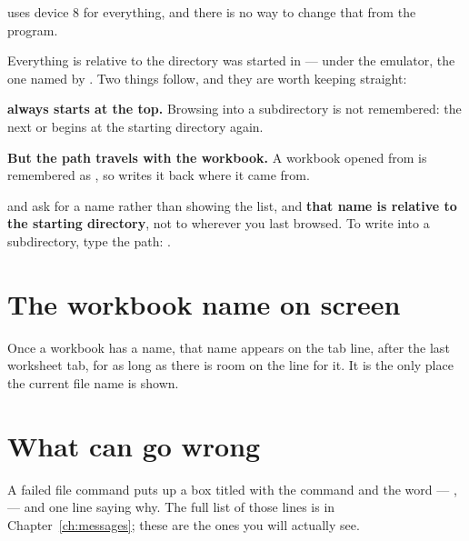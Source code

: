 \ccprod{} uses device 8 for everything, and there is no way to change that from
the program.

Everything is relative to the directory \ccprod{} was started in --- under the
emulator, the one named by . Two things follow, and they are worth
keeping straight:

\begin{ccsteps}
\item \textbf{ always starts at the top.} Browsing into a
subdirectory is not remembered: the next  or 
begins at the starting directory again.
\item \textbf{But the path travels with the workbook.} A workbook opened from
 is remembered as , so 
 writes it back where it came from.
\end{ccsteps}

\begin{cccaution}
 and  ask for a name rather than showing the
list, and \textbf{that name is relative to the starting directory}, not to
wherever you last browsed. To write into a subdirectory, type the path:
.
\end{cccaution}

\section{The workbook name on screen}

Once a workbook has a name, that name appears on the tab line, after the last
worksheet tab, for as long as there is room on the line for it. It is the only
place the current file name is shown.

\section{What can go wrong}

A failed file command puts up a box titled with the command and the word
 --- ,  --- and one line saying
why. The full list of those lines is in Chapter~\ref{ch:messages}; these are the ones you will
actually see.

